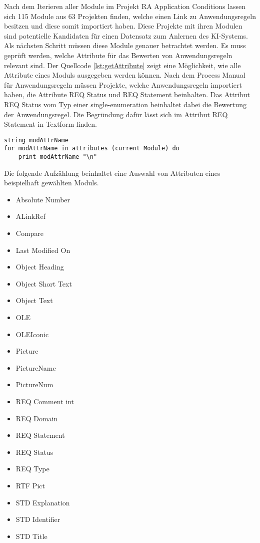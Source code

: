 Nach dem Iterieren aller Module im Projekt RA Application Conditions lassen sich 115 Module aus 63 Projekten finden, welche einen Link zu Anwendungsregeln besitzen und diese somit importiert haben.
Diese Projekte mit ihren Modulen sind potentielle Kandidaten für einen Datensatz zum Anlernen des KI-Systems. Als nächsten Schritt müssen diese Module genauer betrachtet werden. Es muss geprüft werden,
welche Attribute für das Bewerten von Anwendungsregeln relevant sind. Der Quellcode \ref*{lst:getAttribute} zeigt eine Möglichkeit, wie alle Attribute eines Moduls ausgegeben werden können.
Nach dem Process Manual für Anwendungsregeln müssen Projekte, welche Anwendungsregeln importiert haben, die Attribute REQ Status und REQ Statement beinhalten. Das Attribut REQ Status vom Typ einer
single-enumeration beinhaltet dabei die Bewertung der Anwendungsregel. Die Begründung dafür lässt sich im Attribut REQ Statement in Textform finden\cite[S.14]{q2}. 


\begin{lstlisting}[caption={Alle Attribute eines Moduls ausgeben \cite{q9}}, captionpos=b, label = lst:getAttribute] 
string modAttrName
for modAttrName in attributes (current Module) do
    print modAttrName "\n"
\end{lstlisting}

Die folgende Aufzählung beinhaltet eine Auswahl von Attributen eines beispielhaft gewählten Moduls. 

\begin{multicols}{3}
    \begin{itemize}
        \setlength{\itemsep}{0cm}
        \item Absolute Number
        \item ALinkRef
        \item Compare
        \item Last Modified On
        \item Object Heading
        \item Object Short Text
        \item Object Text
        \item OLE
        \item OLEIconic
        \item Picture
        \item PictureName
        \item PictureNum
        \item REQ Comment int
        \item REQ Domain
        \item REQ Statement
        \item REQ Status
        \item REQ Type
        \item RTF Pict
        \item STD Explanation
        \item STD Identifier
        \item STD Title
    \end{itemize}
\end{multicols}

